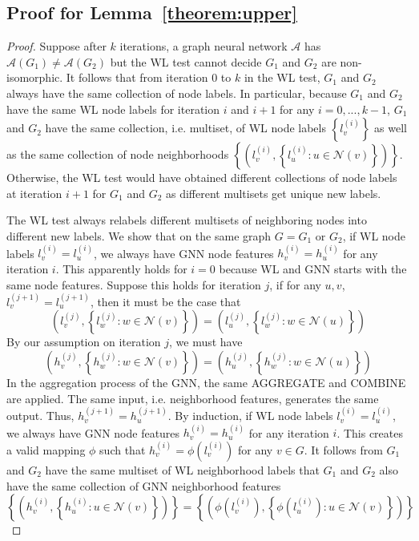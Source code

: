 
\newpage
\vspace*{-10pt}

\begin{appendix}

\section{Proof for Lemma~\ref{theorem:upper}}
\begin{proof}
Suppose  after $k$ iterations, a graph neural network $\mathcal{A}$ has $\mathcal{A}(G_1) \neq \mathcal{A}(G_2)$ but the WL test cannot decide $G_1$ and $G_2$ are non-isomorphic. It follows that from iteration $0$ to $k$ in the WL test, $G_1$ and $G_2$ always have the same collection of node labels. In particular, because $G_1$ and $G_2$ have the same WL node labels for iteration $i$ and $i+1$ for any $i = 0, ..., k-1$, $G_1$ and $G_2$ have the same collection, i.e. multiset, of WL node labels $\left\lbrace l_v^{(i)} \right\rbrace$ as well as the same collection of node neighborhoods $\left\lbrace \left( l_v^{(i)}, \left\lbrace l_u^{(i)}: u \in \mathcal{N}(v) \right\rbrace  \right)  \right\rbrace $. Otherwise, the WL test would have obtained different collections of node labels at iteration $i+1$ for $G_1$ and $G_2$ as different multisets get unique new labels. 

The WL test always relabels different multisets of neighboring nodes into different new labels. We show that on the same graph $G = G_1$ or $G_2$, if WL node labels $l_{v}^{(i)} = l_{u}^{(i)}$, we always have GNN node features $h_v^{(i)} = h_u^{(i)}$ for any iteration $i$. This apparently holds for $i = 0$ because WL and GNN starts with the same node features. Suppose this holds for iteration $j$, if for any $u, v$, $l_{v}^{(j + 1)} = l_{u}^{(j + 1)}$, then it must be the case that 
\[   \left( l_v^{(j)}, \left\lbrace l_w^{(j)}: w \in \mathcal{N}(v) \right\rbrace  \right)   =  \left( l_u^{(j)}, \left\lbrace l_w^{(j)}: w \in \mathcal{N}(u) \right\rbrace  \right)   \]
By our assumption on iteration $j$, we must have 
\[   \left( h_v^{(j)}, \left\lbrace h_w^{(j)}: w \in \mathcal{N}(v) \right\rbrace  \right)   =  \left( h_u^{(j)}, \left\lbrace h_w^{(j)}: w \in \mathcal{N}(u) \right\rbrace  \right)   \]
In the aggregation process of the GNN, the same AGGREGATE and COMBINE are applied. The same input, i.e. neighborhood features, generates the same output. Thus, $h_v^{(j + 1)} = h_u^{(j + 1)}$. By induction, if WL node labels $l_{v}^{(i)} = l_{u}^{(i)}$, we always have GNN node features $h_v^{(i)} = h_u^{(i)}$ for any iteration $i$. This creates a valid mapping $\phi$ such that $h_v^{(i)} = \phi(l_v^{(i)}) $ for any $v \in G$. It follows from $G_1$ and $G_2$ have the same multiset of WL neighborhood labels that $G_1$ and $G_2$ also have the same collection of GNN neighborhood features  \[\left\lbrace \left( h_v^{(i)}, \left\lbrace h_u^{(i)}: u \in \mathcal{N}(v) \right\rbrace  \right)  \right\rbrace =  \left\lbrace \left( \phi( l_v^{(i)} ), \left\lbrace \phi( l_u^{(i)} ): u \in \mathcal{N}(v) \right\rbrace  \right)  \right\rbrace\]


\end{proof}
\end{appendix}
